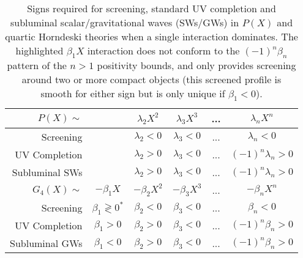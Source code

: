 \documentclass[11pt]{article}
\newcommand{\ccell}{\cellcolor{blue!8}}
\begin{document}
\bgroup
\setlength{\tabcolsep}{15pt}
\begin{table}
\small\centering
\begin{tabular}{ | r | ccccc |}
\hline
$P(X) \sim$ 
&  
& $\lambda_2 X^2$ 
& $\lambda_3 X^3$ 
& ... 
& $\lambda_n X^n$ 
\\
\hline
Screening
&
& $\lambda_2 < 0$ 
& $\lambda_3 < 0$ 
& ... 
& $\lambda_n < 0$ 
\\
UV Completion
&
& $\lambda_2 > 0$ 
& $\lambda_3 < 0$ 
&... 
& $ (-1)^n \lambda_n > 0$ 
\\
Subluminal SWs
&
& $\lambda_2 > 0$ 
& $\lambda_3 < 0$ 
&...
& $ (-1)^n \lambda_n > 0$ 
\\
\hline  \hline
$G_4 (X) \sim$ 
& $- \beta_1 X$   
& $-\beta_2 X^2$ 
& $-\beta_3 X^3$ 
& ... 
& $-\beta_n X^n$ 
\\
\hline 
Screening
&\ccell $\beta_1 \gtrless 0^* $
& $\beta_2 < 0$
& $\beta_3 < 0$
& ... 
& $\beta_n < 0$
\\
UV Completion
& \ccell $\beta_1 > 0$
& $\beta_2 > 0$
& $\beta_3 < 0$
& ...
&  $(-1)^n \beta_n > 0$
\\
Subluminal GWs
& \ccell $\beta_1 < 0$ 
& $\beta_2 > 0$ 
& $\beta_3 < 0$ 
& ... 
& $ (-1)^n \beta_n > 0$ 
\\
\hline
\end{tabular}
\caption{
Signs required for screening, standard UV completion and subluminal scalar/gravitational waves (SWs/GWs) in $P(X)$ and quartic Horndeski theories when a single interaction dominates. 
The highlighted $\beta_1 X$ interaction does not conform to the $(-1)^n \beta_n$ pattern of the $n > 1$ positivity bounds, and only provides screening around two or more compact objects (this screened profile is smooth for either sign but is only unique if $\beta_1 < 0$). 
}
\label{table:summary}
\end{table}



\end{document}
